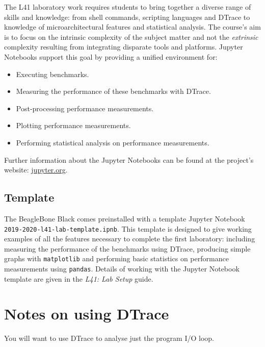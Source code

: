 \documentclass[a4paper,10pt]{article}
\newcommand{\code}[1]{\texttt{\small #1}}
\begin{document}
The L41 laboratory work requires students to bring together a diverse
range of skills and knowledge: from shell commands, scripting languages and
DTrace to knowledge of microarchitectural features and statistical analysis. The
course's aim is to focus on the intrinsic complexity of the subject matter and
not the \textit{extrinsic} complexity resulting from integrating disparate
tools and platforms. Jupyter Notebooks support this goal by providing a unified
environment for:

\begin{itemize}
\item Executing benchmarks.
\item Measuring the performance of these benchmarks with DTrace.
\item Post-processing performance measurements.
\item Plotting performance measurements.
\item Performing statistical analysis on performance measurements.
\end{itemize}


Further information about the Jupyter Notebooks can be found at the
project's website: \url{jupyter.org}.

\subsection*{Template}

The BeagleBone Black comes preinstalled with a template Jupyter Notebook
\code{2019-2020-l41-lab-template.ipnb}. This template is designed to give working
examples of all the features necessary to complete the first laboratory:
including measuring the performance of the benchmarks using DTrace, producing
simple graphs with \code{matplotlib} and performing basic statistics on
performance measurements using \code{pandas}.
Details of working with the Jupyter Notebook template are given in the
\textit{L41: Lab Setup} guide.

\section*{Notes on using DTrace}

You will want to use DTrace to analyse just the program I/O loop.

\end{document}
